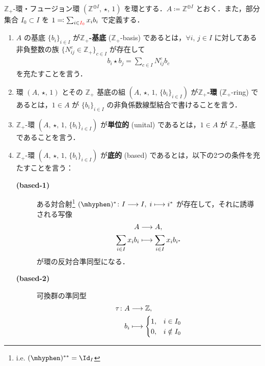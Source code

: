 \documentclass[TQFT_main]{subfiles}
\begin{document}
\begin{mydef}[label=def:Z+ring]{$\mathbb{Z}_+$-環・フュージョン環}
    $(\mathbb{Z}^{\oplus I},\, \star,\, 1)$ を環とする．$A \coloneqq \mathbb{Z}^{\oplus I}$ とおく．また，部分集合 $I_0 \subset I$ を $1 \eqqcolon \sum_{i \in \textcolor{red}{I_0}} x_i b_i$ で定義する．
    \begin{enumerate}
        \item $A$ の基底 $\{b_i\}_{i \in I}$ が\textbf{$\bm{\mathbb{Z}_+}$-基底} ($\mathbb{Z}_+$-basis) であるとは，$\forall i,\, j \in I$ に対してある非負整数の族 $\bigl\{N^c_{ij} \in \mathbb{Z}_{+}\bigr\}_{c \in I}$ が存在して
        \begin{align}
            b_i \star b_j = \sum_{c \in I} N^c_{ij} b_c
        \end{align}
        を充たすことを言う．
        \item 環 $(A,\, \star,\, 1)$ とその $\mathbb{Z}_+$ 基底の組 $(A,\, \star,\, 1,\, \{b_i\}_{i \in I})$ が\textbf{$\bm{\mathbb{Z}_+}$-環} ($\mathbb{Z}_+$-ring) であるとは，$1 \in A$ が $\{b_i\}_{i \in I}$ の非負係数線型結合で書けることを言う．
        \item $\mathbb{Z}_+$-環 $(A,\, \star,\, 1,\, \{b_i\}_{i \in I})$ が\textbf{単位的} (unital) であるとは，$1 \in A$ が $\mathbb{Z}_+$-基底であることを言う．
        \item $\mathbb{Z}_+$-環 $(A,\, \star,\, 1,\, \{b_i\}_{i \in I})$ が\textbf{底的} (based) であるとは，以下の2つの条件を充たすことを言う：
        \begin{description}
            \item[\textbf{(based-1)}] ある対合射\footnote{i.e. $(\mhyphen)^{**} = \Id_I$} $(\mhyphen)^* \colon I \lto I,\; i \lmto i^*$ が存在して，それに誘導される写像
            \begin{align}
                A &\longrightarrow A,\\
                \sum_{i \in I} x_i b_i &\longmapsto \sum_{i \in I} x_i b_{i^*}
            \end{align}
            が環の反対合準同型になる．
            \item[\textbf{(based-2)}] 可換群の準同型
            \begin{align}
                \tau \colon A &\lto \mathbb{Z}, \\
                b_i &\lmto \begin{cases}
                    1, &i \in I_0 \\
                    0, &i \notin I_0
                \end{cases}

\end{align}
\end{description}
\end{enumerate}
\end{mydef}
\end{document}
